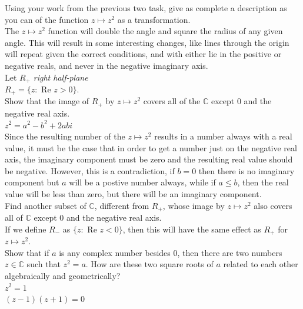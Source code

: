 \documentclass[12pt]{article}
\begin{document}
 Using your work from the previous two task, give as complete a description as you can of the function $z \mapsto z^2$ as a transformation.\\
The $z \mapsto z^2$ function will double the angle and square the radius of any given angle. 
This will result in some interesting changes, like lines through the origin will repeat given the correct conditions, and with either lie in the positive or negative reals, and never in the negative imaginary axis.\\


Let $R_+$ \textit{right half-plane}\\
$R_+ = \{z: $ Re $z > 0\}.$\\


 Show that the image of $R_+$ by $z \mapsto z^2$ covers all of the $\mathbb{C}$ except 0 and the negative real axis.\\

$z^2 = a^2 - b^2 + 2abi$\\

Since the resulting number of the $z \mapsto z^2$ results in a number always with a real value, it must be the case that in order to get a number just on the negative real axis, the imaginary component must be zero and the resulting real value should be negative.
However, this is a contradiction, if $b = 0$ then there is no imaginary component but $a$ will be a postive number always, while if $a \leq b$, then the real value will be less than zero, but there will be an imaginary component.\\


 Find another subset of $\mathbb{C}$, different from $R_+$, whose image by $z \mapsto z^2$ also covers all of $\mathbb{C}$ except 0 and the negative real axis.\\

If we define $R_-$ as $\{z : $ Re $ z < 0\}$, then this will have the same effect as $R_+$ for $z \mapsto z^2$.\\



 Show that if $a$ is any complex number besides 0, then there are two numbers $z \in \mathbb{C}$ such that $z^2 = a$.  How are these two square roots of $a$ related to each other algebraically and geometrically?\\

$z^2 = 1$\\
$(z-1)(z+1) = 0$\\
\end{document}
